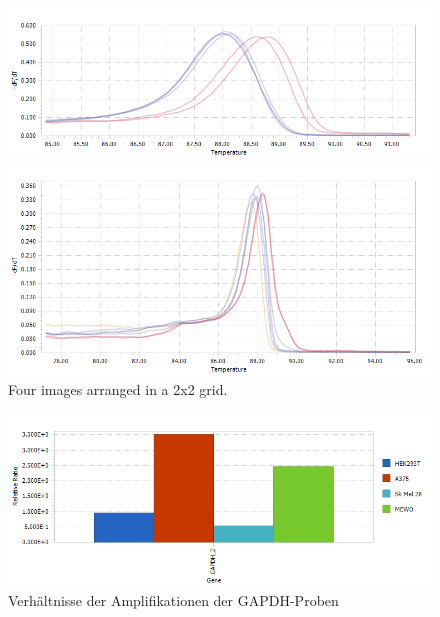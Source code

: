 \documentclass{article}
\begin{document}
\begin{figure}[ht]
    \begin{minipage}[b]{0.45\textwidth}
        \centering
        \includegraphics[width=\textwidth]{images/cycler/bactinmelting.png}
    \end{minipage}
    \begin{minipage}[b]{0.45\textwidth}
        \centering
        \includegraphics[width=\textwidth]{images/cycler/meltingcurves.png}
    \end{minipage}
    \caption{Four images arranged in a 2x2 grid.}
    \label{fig:2x2images}
\end{figure}
\begin{figure}[H]
    \centering
    \includegraphics[width=\textwidth]{images/cycler/G1_2_G2.png}
    \caption{Verhältnisse der Amplifikationen der GAPDH-Proben}
    \label{fig:gapdh}
\end{figure}
\end{document}
